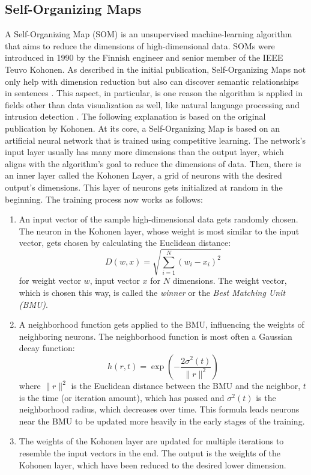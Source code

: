 \subsection{Self-Organizing Maps}
\label{subsec:self-organizing_maps}
A Self-Organizing Map (SOM) is an unsupervised machine-learning algorithm that aims to reduce the dimensions of high-dimensional data. SOMs were introduced in 1990 by the Finnish engineer and senior member of the IEEE Teuvo Kohonen. As described in the initial publication, Self-Organizing Maps not only help with dimension reduction but also can discover semantic relationships in sentences \cite{Kohonen1990}.
This aspect, in particular, is one reason the algorithm is applied in fields other than data visualization as well, like natural language processing and intrusion detection \cite{qu2021survey}. The following explanation is based on the original publication by Kohonen. At its core, a Self-Organizing Map is based on an artificial neural network that is trained using competitive learning. The network's input layer usually has many more dimensions than the output layer, which aligns with the algorithm's goal to reduce the dimensions of data. Then, there is an inner layer called the Kohonen Layer, a grid of neurons with the desired output's dimensions. This layer of neurons gets initialized at random in the beginning. The training process now works as follows:

\begin{enumerate}
	\item An input vector of the sample high-dimensional data gets randomly chosen. The neuron in the Kohonen layer, whose weight is most similar to the input vector, gets chosen by calculating the Euclidean distance: $$D(w, x) = \sqrt{\sum_{i=1}^{N} (w_i - x_i)^2}$$ for weight vector $w$, input vector $x$ for $N$ dimensions. The weight vector, which is chosen this way, is called the \emph{winner} or the \emph{Best Matching Unit (BMU)}.
	\item A neighborhood function gets applied to the BMU, influencing the weights of neighboring neurons. The neighborhood function is most often a Gaussian decay function: $$h(r, t) = \exp\left(-\frac{2\sigma^2(t)}{\|r\|^2}\right)$$ where $\|r\|^2$ is the Euclidean distance between the BMU and the neighbor, $t$ is the time (or iteration amount), which has passed and $\sigma^2(t)$ is the neighborhood radius, which decreases over time. This formula leads neurons near the BMU to be updated more heavily in the early stages of the training.
	\item The weights of the Kohonen layer are updated for multiple iterations to resemble the input vectors in the end. The output is the weights of the Kohonen layer, which have been reduced to the desired lower dimension.
\end{enumerate}
